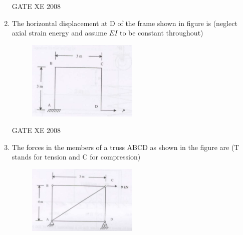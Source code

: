 \documentclass[12pt]{article}
\begin{document}
\begin{enumerate}[label=Q\arabic*.]
\begin{enumerate}[label=(\Alph*)]
\end{enumerate}
    
    GATE XE 2008  


    \item The horizontal displacement at D of the frame shown in figure is (neglect axial strain energy and assume $EI$ to be constant throughout) 

    \begin{figure}[H]
    \centering
    \includegraphics[width=0.5\textwidth]{figs/ass1_f_q23.png}
    \caption{}
    \end{figure}

\begin{enumerate}[label=(\Alph*)]
\end{enumerate}
    
    GATE XE 2008  

    \item The forces in the members of a truss ABCD as shown in the figure are (T stands for tension and C for compression)  

    \begin{figure}[H]
    \centering
    \includegraphics[width=0.5\textwidth]{figs/ass1_f_q24.png}
    \caption{}
    \end{figure}


\end{enumerate}
\end{document}
